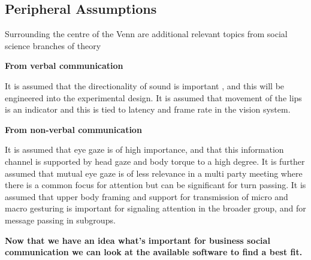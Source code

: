 \subsection{Peripheral Assumptions}
                Surrounding the centre of the Venn are additional relevant topics from social science branches of theory\par
                \textbf{From verbal communication}\par
                It is assumed that the directionality of sound is important \cite{Aoki2003}, and this will be engineered into the experimental design. It is assumed that movement of the lips is an indicator and this is tied to latency and frame rate in the vision system.\par
                \textbf{From non-verbal communication}\par
                It is assumed that eye gaze is of high importance, and that this information channel is supported by head gaze and body torque to a high degree. It is further assumed that mutual eye gaze is of less relevance in a multi party meeting where there is a common focus for attention but can be significant for turn passing.
                It is assumed that upper body framing and support for transmission of micro and macro gesturing is important for signaling attention in the broader group, and for message passing in subgroups.
            
\textbf{Now that we have an idea what's important for business social communication we can look at the available software to find a best fit.}